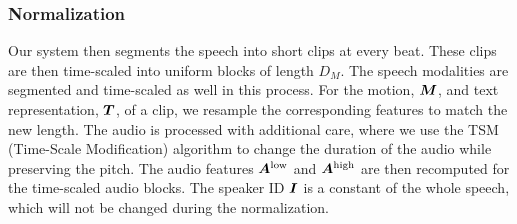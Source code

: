 \subsubsection{Normalization}
\label{subsubsec:normalization}
Our system then segments the speech into short clips at every beat. These clips are then time-scaled into uniform blocks of length $D_M$. The speech modalities are segmented and time-scaled as well in this process. For the motion, $\bm{M}$, and text representation, $\bm{T}$, of a clip, we resample the corresponding features to match the new length. The audio is processed with additional care, where we use the TSM (Time-Scale Modification) algorithm to change the duration of the audio while preserving the pitch. The audio features $\bm{A}^{{\text{low}}}$ and $\bm{A}^{{\text{high}}}$ are then recomputed for the time-scaled audio blocks. The speaker ID $\bm{I}$ is a constant of the whole speech, which will not be changed during the normalization.